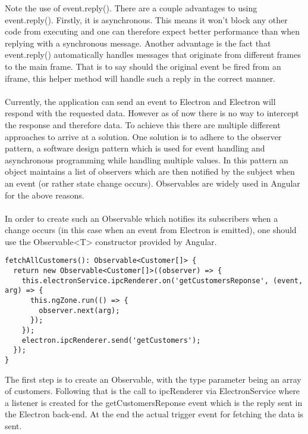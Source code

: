 Note the use of event.reply(). 
There are a couple advantages to using event.reply(). 
Firstly, it is asynchronous. 
This means it won't block any other code from executing and one can therefore expect better performance 
than when replying with a synchronous message.
Another advantage is the fact that event.reply() automatically handles messages that originate from
different frames to the main frame. 
That is to say should the original event be fired from an iframe, this helper method will 
handle such a reply in the correct manner. \parencite{electronDocs}\paragraph{}
Currently, the application can send an event to Electron and Electron will respond with 
the requested data. 
However as of now there is no way to intercept the response and therefore data.
To achieve this there are multiple different approaches to arrive at a solution. 
One solution is to adhere to the observer pattern, a software design pattern which is used 
for event handling and asynchronous programming while handling multiple values.
In this pattern an object maintains a list of observers which are then notified by the 
subject when an event (or rather state change occurs).
Observables are widely used in Angular for the above reasons. \parencite{angularDocsObs}\paragraph{}
In order to create such an Observable which notifies its subscribers when a change occurs (in this 
case when an event from Electron is emitted), one should use the Observable<T> constructor provided
by Angular.
\begin{lstlisting}[caption=Creating an Observable for ipcRenderer]
fetchAllCustomers(): Observable<Customer[]> {
  return new Observable<Customer[]>((observer) => {
    this.electronService.ipcRenderer.on('getCustomersReponse', (event, arg) => {
      this.ngZone.run(() => {
        observer.next(arg);
      });
    });
    electron.ipcRenderer.send('getCustomers');
  });
}
\end{lstlisting}
The first step is to create an Observable, with the type parameter being an array of customers.
Following that is the call to ipcRenderer via ElectronService where a listener is created for 
the getCustomersReponse event which is the reply sent in the Electron back-end.
At the end the actual trigger event for fetching the data is sent. \paragraph{}
